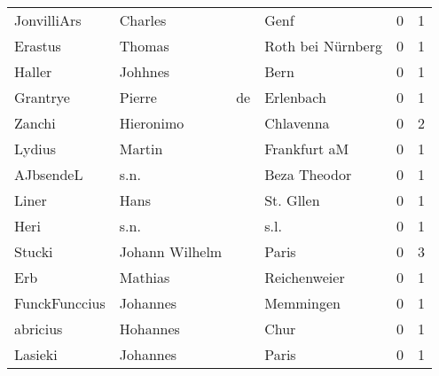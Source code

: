 \begin{tabular}{llllrr}
              JonvilliArs &                            Charles &             &                                        Genf &          0 &         1 \\
                  Erastus &                             Thomas &             &                           Roth bei Nürnberg &          0 &         1 \\
                   Haller &                            Johhnes &             &                                        Bern &          0 &         1 \\
                 Grantrye &                             Pierre &          de &                                   Erlenbach &          0 &         1 \\
                   Zanchi &                          Hieronimo &             &                                   Chlavenna &          0 &         2 \\
                   Lydius &                             Martin &             &                                Frankfurt aM &          0 &         1 \\
                AJbsendeL &                               s.n. &             &                                Beza Theodor &          0 &         1 \\
                    Liner &                               Hans &             &                                   St. Gllen &          0 &         1 \\
                     Heri &                               s.n. &             &                                        s.l. &          0 &         1 \\
                   Stucki &                     Johann Wilhelm &             &                                       Paris &          0 &         3 \\
                      Erb &                            Mathias &             &                                Reichenweier &          0 &         1 \\
            FunckFunccius &                           Johannes &             &                                   Memmingen &          0 &         1 \\
                 abricius &                           Hohannes &             &                                        Chur &          0 &         1 \\
                  Lasieki &                           Johannes &             &                                       Paris &          0 &         1 \\

\end{tabular}
